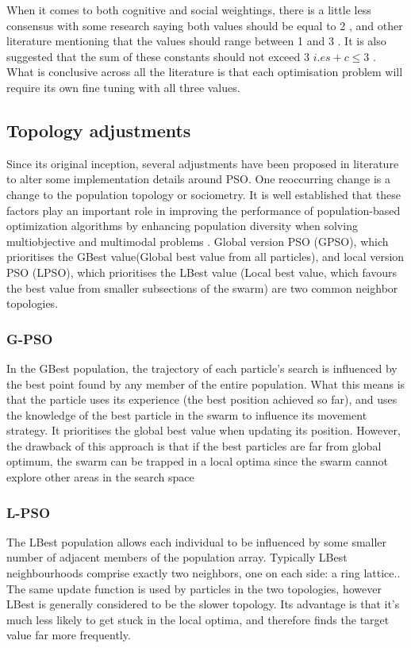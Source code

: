 \documentclass[oneside,12pt]{book}
\begin{document}
When it comes to both cognitive and social weightings, there is a little less consensus with some research saying both values should be equal to 2 \cite{kennedy_eberhart_1995}, and other literature mentioning that the values should range between 1 and 3 \cite{ZHANG20143576}. It is also suggested that the sum of these constants should not exceed 3 \(i.e s+c \leq 3\) \cite{kan2012convergence}. What is conclusive across all the literature is that each optimisation problem will require its own fine tuning with all three values. 

\subsection{Topology adjustments}
Since its original inception, several adjustments have been proposed in literature to alter some implementation details around PSO. One reoccurring change is a change to the population topology or sociometry. It is well established that these factors play an important role in improving the performance of population-based optimization algorithms by enhancing population diversity when solving multiobjective and multimodal problems \cite{LYNN201824}. Global version PSO (GPSO), which prioritises the GBest value(Global best value from all particles), and local version PSO (LPSO), which prioritises the LBest value (Local best value, which favours the best value from smaller subsections of the swarm) are two common neighbor topologies. 

\subsubsection{G-PSO}
In the GBest population, the trajectory of each particle’s search is influenced by the best point found by any member of the entire population\cite{kennedy2002population}. What this means is that the particle uses its experience (the best position achieved so far), and uses the knowledge of the best particle in the swarm to influence its movement strategy. It prioritises the global best value when updating its position. However, the drawback of this approach is that if the best particles are far from global optimum, the swarm can be trapped in a local optima since the swarm cannot explore other areas in the search space \cite{azab_hady_hefny_2016}

\subsubsection{L-PSO}
The LBest population allows each individual to be influenced by some smaller number of adjacent members of the population array. Typically LBest neighbourhoods comprise exactly two neighbors, one on each side: a ring lattice.\cite{kennedy2002population}. The same update function is used by particles in the two topologies, however LBest is generally considered to be the slower topology. Its advantage is that it's much less likely to get stuck in the local optima, and therefore finds the target value far more frequently. 
\end{document}
